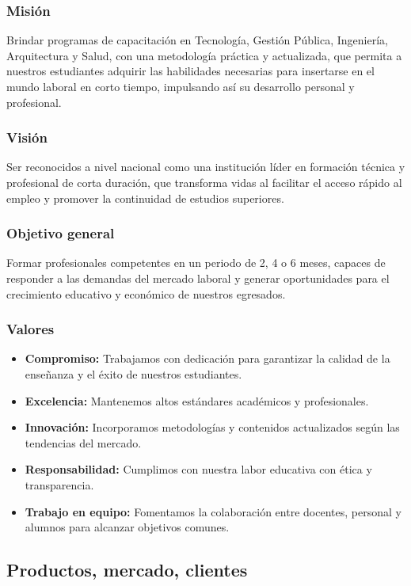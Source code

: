 \documentclass[stu, 12pt,letterpaper,donotrepeattitle,floatsintext,natbib]{apa7}
\begin{document}
	
	\subsubsection{Misión}
	Brindar programas de capacitación en Tecnología, Gestión Pública, Ingeniería, Arquitectura y Salud, con una metodología práctica y actualizada, que permita a nuestros estudiantes adquirir las habilidades necesarias para insertarse en el mundo laboral en corto tiempo, impulsando así su desarrollo personal y profesional.
	
	\subsubsection{Visión}
	Ser reconocidos a nivel nacional como una institución líder en formación técnica y profesional de corta duración, que transforma vidas al facilitar el acceso rápido al empleo y promover la continuidad de estudios superiores.
	
	\subsubsection{Objetivo general}
	Formar profesionales competentes en un periodo de 2, 4 o 6 meses, capaces de responder a las demandas del mercado laboral y generar oportunidades para el crecimiento educativo y económico de nuestros egresados.
	
	\subsubsection{Valores}
	\begin{itemize}
		\item \textbf{Compromiso:} Trabajamos con dedicación para garantizar la calidad de la enseñanza y el éxito de nuestros estudiantes.
		\item \textbf{Excelencia:} Mantenemos altos estándares académicos y profesionales.
		\item \textbf{Innovación:} Incorporamos metodologías y contenidos actualizados según las tendencias del mercado.
		\item \textbf{Responsabilidad:} Cumplimos con nuestra labor educativa con ética y transparencia.
		\item \textbf{Trabajo en equipo:} Fomentamos la colaboración entre docentes, personal y alumnos para alcanzar objetivos comunes.
	\end{itemize}
	
	
	
	\subsection{Productos, mercado, clientes}
\end{document}
